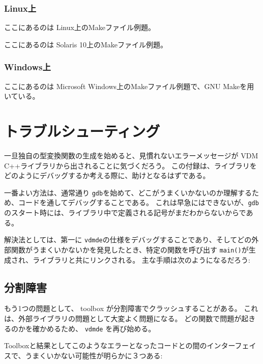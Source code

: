 \documentclass[\pformat,12pt]{jarticle}
\begin{document}
\subsubsection{Linux上}\label{makefiles:linux}

ここにあるのは Linux上のMakeファイル例題。 




ここにあるのは Solaris 10上のMakeファイル例題。




\subsubsection{Windows上}\label{makefiles:win}
ここにあるのは Microsoft Windows上のMakeファイル例題で、GNU Makeを用いている。






\section{トラブルシューティング}
一旦独自の型変換関数の生成を始めると、見慣れないエラーメッセージが VDM C++ライブラリから出されることに気づくだろう。
この付録は、ライブラリをどのようにデバッグするか考える際に、助けとなるはずである。

一番よい方法は、通常通り {\tt gdb}を始めて、どこがうまくいかないのか理解するため、コードを通してデバッグすることである。
これは早急にはできないが、{\tt gdb}のスタート時には、ライブラリ中で定義される記号がまだわからないからである。

解決法としては、第一に {\tt vdmde}の仕様をデバッグすることであり、そしてどの外部関数がうまくいかないかを発見したとき、特定の関数を呼び出す {\tt main()}が生成され、ライブラリと共にリンクされる。
主な手順は次のようになるだろう:



\subsection{分割障害}

もう1つの問題として、 toolbox が分割障害でクラッシュすることがある。
これは、外部ライブラリの問題として大変よく問題になる。
どの関数で問題が起きるのかを確かめるため、 {\tt vdmde} を再び始める。

Toolboxと結果としてこのようなエラーとなったコードとの間のインターフェイスで、うまくいかない可能性が明らかに３つある:
\end{document}
